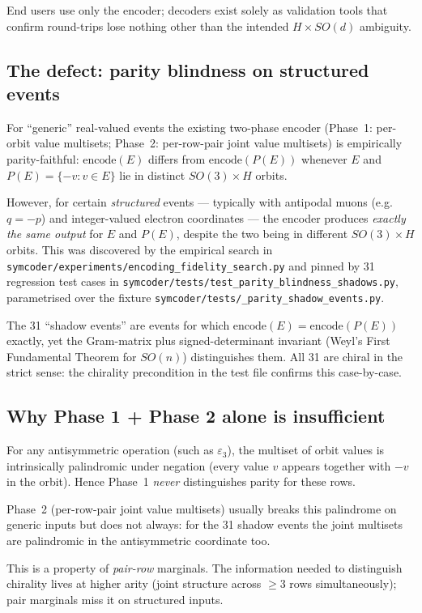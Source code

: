 \documentclass[a4paper,11pt]{article}
\begin{document}
\noindent
End users use only the encoder; decoders exist solely as validation
tools that confirm round-trips lose nothing other than the intended
$H \times SO(d)$ ambiguity.

\subsection{The defect: parity blindness on structured events}
For ``generic'' real-valued events the existing two-phase encoder
(Phase~1: per-orbit value multisets; Phase~2: per-row-pair joint value
multisets) is empirically parity-faithful: $\text{encode}(E)$ differs
from $\text{encode}(P(E))$ whenever $E$ and $P(E) = \{-v : v \in E\}$
lie in distinct $SO(3) \times H$ orbits.

However, for certain \emph{structured} events --- typically with
antipodal muons (e.g.\ $q = -p$) and integer-valued electron
coordinates --- the encoder produces \emph{exactly the same output}
for $E$ and $P(E)$, despite the two being in different $SO(3) \times H$
orbits.  This was discovered by the empirical search in
\texttt{symcoder/experiments/encoding\_fidelity\_search.py} and pinned
by 31 regression test cases in
\texttt{symcoder/tests/test\_parity\_blindness\_shadows.py},
parametrised over the fixture
\texttt{symcoder/tests/\_parity\_shadow\_events.py}.

The 31 ``shadow events'' are events for which
$\text{encode}(E) = \text{encode}(P(E))$ exactly, yet the Gram-matrix
plus signed-determinant invariant (Weyl's First Fundamental Theorem for
$SO(n)$) distinguishes them.  All 31 are chiral in the strict sense:
the chirality precondition in the test file confirms this case-by-case.

\subsection{Why Phase 1 + Phase 2 alone is insufficient}
For any antisymmetric operation (such as $\varepsilon_3$), the
multiset of orbit values is intrinsically palindromic under negation
(every value $v$ appears together with $-v$ in the orbit).  Hence
Phase~1 \emph{never} distinguishes parity for these rows.

Phase~2 (per-row-pair joint value multisets) usually breaks this
palindrome on generic inputs but does not always: for the 31 shadow
events the joint multisets are palindromic in the antisymmetric
coordinate too.

This is a property of \emph{pair-row} marginals.  The information
needed to distinguish chirality lives at higher arity (joint structure
across $\ge 3$ rows simultaneously); pair marginals miss it on
structured inputs.
\end{document}
